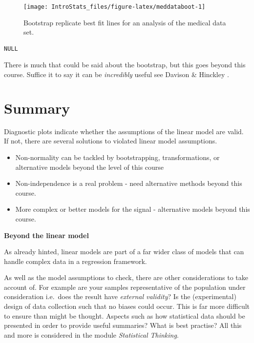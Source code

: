 \documentclass[
  oneside]{krantz}
\begin{document}
\begin{figure}

{\centering \texttt{[image: IntroStats\_files/figure-latex/meddataboot-1]} 

}

\caption{Bootstrap replicate best fit lines for an analysis of the medical data set.}\label{fig:meddataboot}
\end{figure}

\begin{verbatim}
NULL
\end{verbatim}

There is much that could be said about the bootstrap, but this goes beyond this course. Suffice it to say it can be \emph{incredibly} useful see Davison \& Hinckley \citeyearpar{Davison1997}.

\hypertarget{summary-1}{%
\section{Summary}\label{summary-1}}

Diagnostic plots indicate whether the assumptions of the linear model are valid. If not, there are several solutions to violated linear model assumptions.

\begin{itemize}
\item
  Non-normality can be tackled by bootstrapping, transformations, or alternative models beyond the level of this course
\item
  Non-independence is a real problem - need alternative methods beyond this course.
\item
  More complex or better models for the signal - alternative models beyond this course.
\end{itemize}

\textbf{Beyond the linear model}

As already hinted, linear models are part of a far wider class of models that can handle complex data in a regression framework.

As well as the model assumptions to check, there are other considerations to take account of. For example are your samples representative of the population under consideration i.e.~does the result have \emph{external validity}? Is the (experimental) design of data collection such that no biases could occur. This is far more difficult to ensure than might be thought. Aspects such as how statistical data should be presented in order to provide useful summaries? What is best practise? All this and more is considered in the module \emph{Statistical Thinking}.
\end{document}
